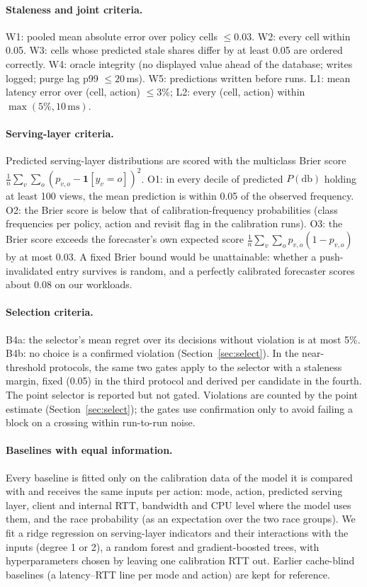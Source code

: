 \documentclass[acmsmall,review,nonacm]{acmart}
\begin{document}
\paragraph{Staleness and joint criteria.}
W1: pooled mean absolute error over policy cells $\le 0.03$. W2: every cell within 0.05. W3: cells whose predicted stale shares differ by at least 0.05 are ordered correctly. W4: oracle integrity (no displayed value ahead of the database; writes logged; purge lag p99 $\le 20$\,ms). W5: predictions written before runs. L1: mean latency error over (cell, action) $\le 3\%$; L2: every (cell, action) within $\max(5\%,10\,\text{ms})$.

\paragraph{Serving-layer criteria.}
Predicted serving-layer distributions are scored with the multiclass Brier score $\frac1n\sum_v\sum_o (p_{v,o}-\mathbf{1}[y_v=o])^2$. O1: in every decile of predicted $P(\text{db})$ holding at least 100 views, the mean prediction is within 0.05 of the observed frequency. O2: the Brier score is below that of calibration-frequency probabilities (class frequencies per policy, action and revisit flag in the calibration runs). O3: the Brier score exceeds the forecaster's own expected score $\frac1n\sum_v\sum_o p_{v,o}(1-p_{v,o})$ by at most 0.03. A fixed Brier bound would be unattainable: whether a push-invalidated entry survives is random, and a perfectly calibrated forecaster scores about 0.08 on our workloads.

\paragraph{Selection criteria.}
B4a: the selector's mean regret over its decisions without violation is at most 5\%. B4b: no choice is a confirmed violation (Section~\ref{sec:select}). In the near-threshold protocols, the same two gates apply to the selector with a staleness margin, fixed (0.05) in the third protocol and derived per candidate in the fourth. The point selector is reported but not gated. Violations are counted by the point estimate (Section~\ref{sec:select}); the gates use confirmation only to avoid failing a block on a crossing within run-to-run noise.

\paragraph{Baselines with equal information.}
Every baseline is fitted only on the calibration data of the model it is compared with and receives the same inputs per action: mode, action, predicted serving layer, client and internal RTT, bandwidth and CPU level where the model uses them, and the race probability (as an expectation over the two race groups). We fit a ridge regression on serving-layer indicators and their interactions with the inputs (degree 1 or 2), a random forest and gradient-boosted trees, with hyperparameters chosen by leaving one calibration RTT out. Earlier cache-blind baselines (a latency--RTT line per mode and action) are kept for reference.
\end{document}
